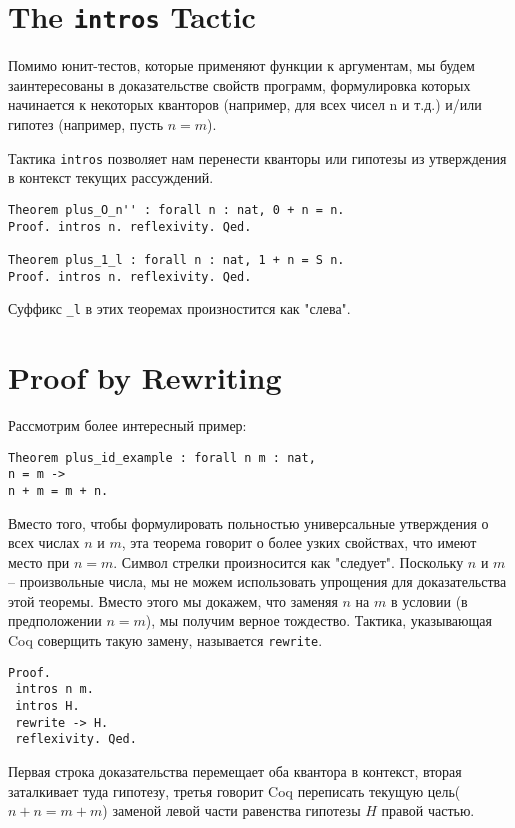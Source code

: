 \documentclass[12pt,a4paper,draft]{article}
\begin{document}
\section{The \texttt{intros} Tactic}

Помимо юнит-тестов, которые применяют функции к аргументам, мы будем заинтересованы в доказательстве свойств программ, формулировка которых начинается к некоторых кванторов (например, для всех чисел n и т.д.) и/или гипотез (например, пусть $n = m$).

Тактика \texttt{intros} позволяет нам перенести кванторы или гипотезы из утверждения в контекст текущих рассуждений.

\begin{verbatim}
Theorem plus_O_n'' : forall n : nat, 0 + n = n.
Proof. intros n. reflexivity. Qed.

Theorem plus_1_l : forall n : nat, 1 + n = S n.
Proof. intros n. reflexivity. Qed.
\end{verbatim}

Суффикс \texttt{\_l} в этих теоремах произностится как "слева".

\section{Proof by Rewriting}

Рассмотрим более интересный пример:

\begin{verbatim}
Theorem plus_id_example : forall n m : nat,
n = m ->
n + m = m + n.
\end{verbatim}

Вместо того, чтобы формулировать польностью универсальные утверждения о всех числах $n$ и $m$, эта теорема говорит о более узких свойствах, что имеют место при $n=m$. Символ стрелки произносится как "следует". Поскольку $n$ и $m$ -- произвольные числа, мы не можем использовать упрощения для доказательства этой теоремы. Вместо этого мы докажем, что заменяя $n$ на $m$ в условии (в предположении $n=m$), мы получим верное тождество. Тактика, указывающая Coq соверщить такую замену, называется \texttt{rewrite}.

\begin{verbatim}
Proof.
 intros n m.
 intros H.
 rewrite -> H.
 reflexivity. Qed.
\end{verbatim}

Первая строка доказательства перемещает оба квантора в контекст, вторая заталкивает туда гипотезу, третья говорит Coq переписать текущую цель($n + n = m + m$) заменой левой части равенства гипотезы $H$ правой частью.
\end{document}
